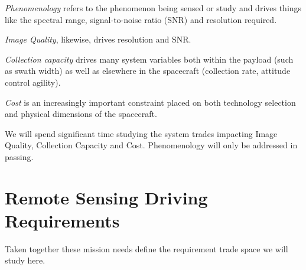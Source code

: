 \documentclass[10pt,journal]{IEEEtran}  %
\begin{document}
\emph{Phenomenology} refers to the phenomenon being sensed or study and drives things like the spectral range, signal-to-noise ratio (SNR) and resolution required.  

\emph{Image Quality}, likewise, drives resolution and SNR.  

\emph{Collection capacity} drives many system variables both within the payload (such as swath width) as well as elsewhere in the spacecraft (collection rate, attitude control agility).  

\emph{Cost} is an increasingly important constraint placed on both technology selection and physical dimensions of the spacecraft.

We will spend significant time studying the system trades impacting Image Quality, Collection Capacity and Cost.  Phenomenology will only be addressed in passing.

\section{Remote Sensing Driving Requirements}
\label{sec:requirements}

Taken together these mission needs define the requirement trade space we will study here.
\end{document}
